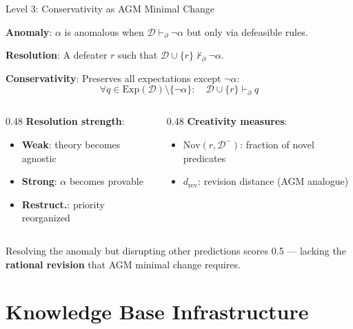 \documentclass[aspectratio=169]{beamer}
\newcommand{\D}{\mathcal{D}}
\newcommand{\Dm}{\mathcal{D}^{-}}
\newcommand{\pPartial}{\vdash_{\partial}}
\newcommand{\Exp}{\mathrm{Exp}}
\newcommand{\Nov}{\mathrm{Nov}}
\begin{document}
\begin{frame}{Level 3: Conservativity as AGM Minimal Change}

\small
\textbf{Anomaly}: $\alpha$ is anomalous when $\D \pPartial \neg\alpha$ but only via defeasible rules.

\textbf{Resolution}: A defeater $r$ such that $\D \cup \{r\} \not\pPartial \neg\alpha$.

\textbf{Conservativity}: Preserves all expectations except $\neg\alpha$:
\vspace{-0.3em}
\[
\forall q \in \Exp(\D) \setminus \{\neg\alpha\}: \quad \D \cup \{r\} \pPartial q
\]

\vspace{-0.3em}
\begin{columns}[T]
\begin{column}{0.48\textwidth}
\textbf{Resolution strength}:
\begin{itemize}\setlength\itemsep{1pt}
    \item \textbf{Weak}: theory becomes agnostic
    \item \textbf{Strong}: $\alpha$ becomes provable
    \item \textbf{Restruct.}: priority reorganized
\end{itemize}
\end{column}
\begin{column}{0.48\textwidth}
\textbf{Creativity measures}:
\begin{itemize}\setlength\itemsep{1pt}
    \item $\Nov(r, \Dm)$: fraction of novel predicates
    \item $d_{\mathrm{rev}}$: revision distance (AGM analogue)
\end{itemize}
\end{column}
\end{columns}

\vspace{0.3em}
Resolving the anomaly but disrupting other predictions scores 0.5 --- lacking the \textbf{rational revision} that AGM minimal change requires.
\end{frame}


\section{Knowledge Base Infrastructure}
\end{document}
